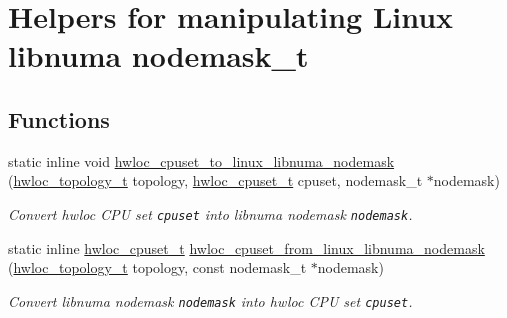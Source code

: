 \hypertarget{group__hwlocality__linux__libnuma__nodemask}{
\section{Helpers for manipulating Linux libnuma nodemask\_\-t}
\label{group__hwlocality__linux__libnuma__nodemask}
}
\subsection*{Functions}
\begin{CompactItemize}
\item 
static inline void \hyperlink{group__hwlocality__linux__libnuma__nodemask_gd6c037010e89674b799ed8131d7a632c}{hwloc\_\-cpuset\_\-to\_\-linux\_\-libnuma\_\-nodemask} (\hyperlink{group__hwlocality__topology_g9d1e76ee15a7dee158b786c30b6a6e38}{hwloc\_\-topology\_\-t} topology, \hyperlink{group__hwlocality__cpuset_g82e51d695c430832b703dad5ab8d75e4}{hwloc\_\-cpuset\_\-t} cpuset, nodemask\_\-t $\ast$nodemask)
\begin{CompactList}\small\item\em Convert hwloc CPU set {\tt cpuset} into libnuma nodemask {\tt nodemask}. \item\end{CompactList}\item 
static inline \hyperlink{group__hwlocality__cpuset_g82e51d695c430832b703dad5ab8d75e4}{hwloc\_\-cpuset\_\-t} \hyperlink{group__hwlocality__linux__libnuma__nodemask_gc199bbdcd7913ce17bd36a168e00991f}{hwloc\_\-cpuset\_\-from\_\-linux\_\-libnuma\_\-nodemask} (\hyperlink{group__hwlocality__topology_g9d1e76ee15a7dee158b786c30b6a6e38}{hwloc\_\-topology\_\-t} topology, const nodemask\_\-t $\ast$nodemask)
\begin{CompactList}\small\item\em Convert libnuma nodemask {\tt nodemask} into hwloc CPU set {\tt cpuset}. \item\end{CompactList}\end{CompactItemize}


